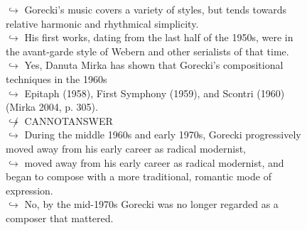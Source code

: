 \documentclass[11pt,a4paper, onecolumn]{article}
\begin{document}
\begin{figure}[t] \small \begin{tcolorbox}[boxsep=0pt,left=5pt,right=0pt,top=2pt,colback = yellow!5] \begin{dialogue}
 \small 
\colorbox{pink!25}{$\hookrightarrow$}
{ Gorecki's music covers a variety of styles, but tends towards relative harmonic and rhythmical simplicity. }
\\
\colorbox{pink!25}{$\hookrightarrow$}
{ His first works, dating from the last half of the 1950s, were in the avant-garde style of Webern and other serialists of that time. }
\\
\colorbox{pink!25}{$\hookrightarrow$}
\colorbox{red!25}{Yes,}
{ Danuta Mirka has shown that Gorecki's compositional techniques in the 1960s }
\\
\colorbox{pink!25}{$\hookrightarrow$}
{ Epitaph (1958), First Symphony (1959), and Scontri (1960) (Mirka 2004, p. 305). }
\\
\colorbox{pink!25}{$\not\hookrightarrow$}
{ CANNOTANSWER }
\\
\colorbox{pink!25}{$\hookrightarrow$}
{ During the middle 1960s and early 1970s, Gorecki progressively moved away from his early career as radical modernist, }
\\
\colorbox{pink!25}{$\hookrightarrow$}
{ moved away from his early career as radical modernist, and began to compose with a more traditional, romantic mode of expression. }
\\
\colorbox{pink!25}{$\hookrightarrow$}
\colorbox{red!25}{No,}
{ by the mid-1970s Gorecki was no longer regarded as a composer that mattered. }
 \end{dialogue}\end{tcolorbox}\end{figure}\begin{figure}[t] \small \begin{tcolorbox}[boxsep=0pt,left=5pt,right=0pt,top=2pt,colback = yellow!5] \begin{dialogue}
 \small 

\end{dialogue}
\end{tcolorbox}
\end{figure}
\end{document}
